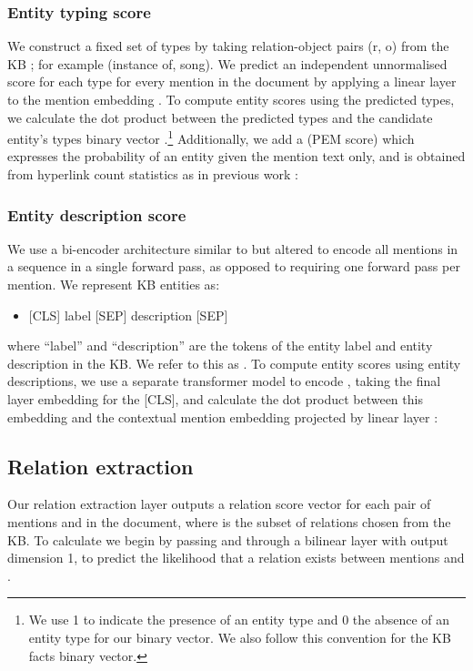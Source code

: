 \documentclass[11pt]{article}
\begin{document}
\subsubsection{Entity typing score }
We construct a fixed set of types  by taking relation-object pairs (r, o) from the KB ; for example (instance of, song). We predict an independent unnormalised score for each type  for every mention in the document by applying a linear layer  to the mention embedding . To compute entity scores  using the predicted types, we calculate the dot product between the predicted types and the candidate entity's types binary vector .\footnote{We use 1 to indicate the presence of an entity type and 0 the absence of an entity type for our binary vector. We also follow this convention for the KB facts binary vector.} Additionally, we add a  (PEM score) which expresses the probability of an entity given the mention text only, and is obtained from hyperlink count statistics as in previous work \cite{Raiman2018DeepTypeME}:

 

\subsubsection{Entity description score }
We use a bi-encoder architecture similar to \cite{blink} but altered to encode all mentions in a sequence in a single forward pass, as opposed to requiring one forward pass per mention. We represent KB entities as:
\begin{itemize}
\item[] {[CLS] label [SEP] description [SEP]}
\end{itemize}
where ``label'' and ``description'' are the tokens of the entity label and entity description in the KB. We refer to this as . To compute entity scores  using entity descriptions, we use a separate transformer model  to encode , taking the final layer embedding for the [CLS], and calculate the dot product between this embedding and the contextual mention embedding  projected by linear layer :






\subsection{Relation extraction}
\label{subsec:relation-extraction}
Our relation extraction layer outputs a relation score vector  for each pair of mentions  and  in the document, where  is the subset of relations chosen from the KB. To calculate  we begin by passing  and  through a bilinear layer  with output dimension 1, to predict the likelihood  that a relation exists between mentions  and . 
    
\end{document}
